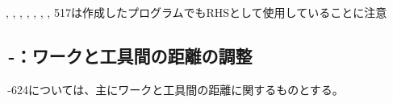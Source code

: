 \begin{marker}
, , , , , , , \ttNum517は作成したプログラムでもRHSとして使用していることに注意
\end{marker}



\clearpage


\subsection{\,-：ワークと工具間の距離の調整}
\,-\ttNum624については、主にワークと工具間の距離に関するものとする。\\

